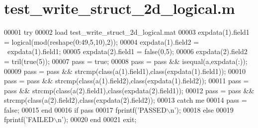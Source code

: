 \hypertarget{test__write__struct__2d__logical_8m_source}{}\section{test\+\_\+write\+\_\+struct\+\_\+2d\+\_\+logical.\+m}
\label{test__write__struct__2d__logical_8m_source}

\begin{DoxyCode}
00001 \textcolor{keywordflow}{try}
00002     load test\_write\_struct\_2d\_logical.mat
00003     expdata(1).field1 = logical(mod(reshape(0:49,5,10),2));
00004     expdata(1).field2 = ~expdata(1).field1;
00005     expdata(2).field1 = \textcolor{keyword}{false}(0,5);
00006     expdata(2).field2 = tril(\textcolor{keyword}{true}(5));
00007     pass = \textcolor{keyword}{true};
00008     pass = pass && isequal(a,expdata(:));
00009     pass = pass && strcmp(\textcolor{keyword}{class}(a(1).field1),\textcolor{keyword}{class}(expdata(1).field1));
00010     pass = pass && strcmp(\textcolor{keyword}{class}(a(1).field2),\textcolor{keyword}{class}(expdata(1).field2));
00011     pass = pass && strcmp(\textcolor{keyword}{class}(a(2).field1),\textcolor{keyword}{class}(expdata(2).field1));
00012     pass = pass && strcmp(\textcolor{keyword}{class}(a(2).field2),\textcolor{keyword}{class}(expdata(2).field2));
00013 \textcolor{keywordflow}{catch} me
00014     pass = \textcolor{keyword}{false};
00015 end
00016 \textcolor{keywordflow}{if} pass
00017     fprintf(\textcolor{stringliteral}{'PASSED\(\backslash\)n'});
00018 \textcolor{keywordflow}{else}
00019     fprintf(\textcolor{stringliteral}{'FAILED\(\backslash\)n'});
00020 end
00021 exit;
\end{DoxyCode}
